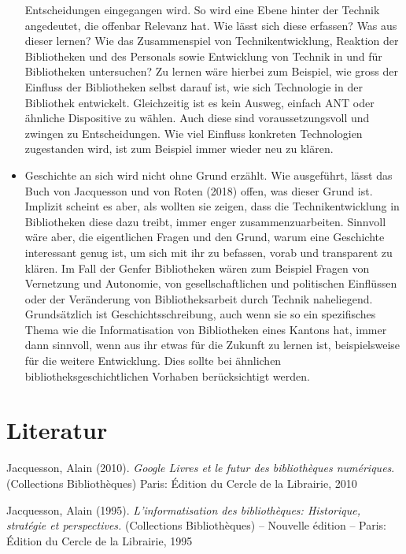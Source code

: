\documentclass[a4paper,
fontsize=11pt,
oneside,
numbers=noperiodatend,
parskip=half-,
bibliography=totoc,
final
]{scrartcl}
\begin{document}
\begin{itemize}
  Entscheidungen eingegangen wird. So wird eine Ebene hinter der Technik
  angedeutet, die offenbar Relevanz hat. Wie lässt sich diese erfassen?
  Was aus dieser lernen? Wie das Zusammenspiel von Technikentwicklung,
  Reaktion der Bibliotheken und des Personals sowie Entwicklung von
  Technik in und für Bibliotheken untersuchen? Zu lernen wäre hierbei
  zum Beispiel, wie gross der Einfluss der Bibliotheken selbst darauf
  ist, wie sich Technologie in der Bibliothek entwickelt. Gleichzeitig
  ist es kein Ausweg, einfach ANT oder ähnliche Dispositive zu wählen.
  Auch diese sind voraussetzungsvoll und zwingen zu Entscheidungen. Wie
  viel Einfluss konkreten Technologien zugestanden wird, ist zum
  Beispiel immer wieder neu zu klären.
\item
  Geschichte an sich wird nicht ohne Grund erzählt. Wie ausgeführt,
  lässt das Buch von Jacquesson und von Roten (2018) offen, was dieser
  Grund ist. Implizit scheint es aber, als wollten sie zeigen, dass die
  Technikentwicklung in Bibliotheken diese dazu treibt, immer enger
  zusammenzuarbeiten. Sinnvoll wäre aber, die eigentlichen Fragen und
  den Grund, warum eine Geschichte interessant genug ist, um sich mit
  ihr zu befassen, vorab und transparent zu klären. Im Fall der Genfer
  Bibliotheken wären zum Beispiel Fragen von Vernetzung und Autonomie,
  von gesellschaftlichen und politischen Einflüssen oder der Veränderung
  von Bibliotheksarbeit durch Technik naheliegend. Grundsätzlich ist
  Geschichtsschreibung, auch wenn sie so ein spezifisches Thema wie die
  Informatisation von Bibliotheken eines Kantons hat, immer dann
  sinnvoll, wenn aus ihr etwas für die Zukunft zu lernen ist,
  beispielsweise für die weitere Entwicklung. Dies sollte bei ähnlichen
  bibliotheksgeschichtlichen Vorhaben berücksichtigt werden.
\end{itemize}

\hypertarget{literatur}{%
\section{Literatur}\label{literatur}}

Jacquesson, Alain (2010). \emph{Google Livres et le futur des
bibliothèques numériques}. (Collections Bibliothèques) Paris: Édition du
Cercle de la Librairie, 2010

Jacquesson, Alain (1995). \emph{L'informatisation des bibliothèques:
Historique, stratégie et perspectives.} (Collections Bibliothèques) --
Nouvelle édition -- Paris: Édition du Cercle de la Librairie, 1995
\end{document}
